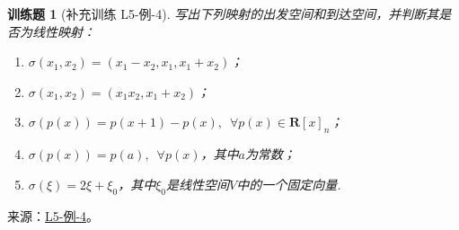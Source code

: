 \documentclass[12pt,fontset=fandol]{ctexart}
\newtheorem{exercise}{训练题}[section]
\begin{document}
\begin{exercise}[补充训练 L5-例-4]\label{prob:L5-例-4}
写出下列映射的出发空间和到达空间，并判断其是否为线性映射：
    \begin{enumerate}
        \item $\sigma(x_1,x_2)=(x_1-x_2,x_1,x_1+x_2)$；

        \item $\sigma(x_1,x_2)=(x_1x_2,x_1+x_2)$；

        \item $\sigma(p(x))=p(x+1)-p(x),\enspace\forall p(x) \in \mathbf{R}[x]_n$；

        \item $\sigma(p(x))=p(a),\enspace\forall p(x)$，其中$a$为常数；

        \item $\sigma(\xi)=2\xi+\xi_0$，其中$\xi_0$是线性空间$V$中的一个固定向量.
    \end{enumerate}
\end{exercise}
\noindent 来源：\href{https://github.com/yhwu-is/Linear-Algebra-Left-Undone/blob/new/%E8%AE%B2%E4%B9%89/%E4%B8%93%E9%A2%98/5%20%E7%BA%BF%E6%80%A7%E6%98%A0%E5%B0%84.tex}{L5-例-4}。
\end{document}
